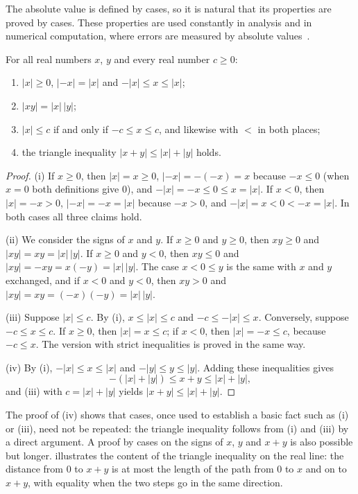The absolute value is defined by cases, so it is natural that its properties are proved by cases. These properties are used constantly in analysis and in numerical computation, where errors are measured by absolute values~\cite{spivak2008calculus}.

\begin{proposition}
\label{prop:abs}
For all real numbers $x$, $y$ and every real number $c\ge0$:
\begin{enumerate}
\item $|x|\ge0$, $|-x|=|x|$ and $-|x|\le x\le|x|$;
\item $|xy|=|x|\,|y|$;
\item $|x|\le c$ if and only if $-c\le x\le c$, and likewise with $<$ in both places;
\item the triangle inequality $|x+y|\le|x|+|y|$ holds.
\end{enumerate}
\end{proposition}

\begin{proof}
(i) If $x\ge0$, then $|x|=x\ge0$, $|-x|=-(-x)=x$ because $-x\le0$ (when $x=0$ both definitions give $0$), and $-|x|=-x\le0\le x=|x|$. If $x<0$, then $|x|=-x>0$, $|-x|=-x=|x|$ because $-x>0$, and $-|x|=x<0<-x=|x|$. In both cases all three claims hold.

(ii) We consider the signs of $x$ and $y$. If $x\ge0$ and $y\ge0$, then $xy\ge0$ and $|xy|=xy=|x|\,|y|$. If $x\ge0$ and $y<0$, then $xy\le0$ and $|xy|=-xy=x(-y)=|x|\,|y|$. The case $x<0\le y$ is the same with $x$ and $y$ exchanged, and if $x<0$ and $y<0$, then $xy>0$ and $|xy|=xy=(-x)(-y)=|x|\,|y|$.

(iii) Suppose $|x|\le c$. By (i), $x\le|x|\le c$ and $-c\le-|x|\le x$. Conversely, suppose $-c\le x\le c$. If $x\ge0$, then $|x|=x\le c$; if $x<0$, then $|x|=-x\le c$, because $-c\le x$. The version with strict inequalities is proved in the same way.

(iv) By (i), $-|x|\le x\le|x|$ and $-|y|\le y\le|y|$. Adding these inequalities gives
\[
-(|x|+|y|)\le x+y\le|x|+|y|,
\]
and (iii) with $c=|x|+|y|$ yields $|x+y|\le|x|+|y|$.
\end{proof}

The proof of (iv) shows that cases, once used to establish a basic fact such as (i) or (iii), need not be repeated: the triangle inequality follows from (i) and (iii) by a direct argument. A proof by cases on the signs of $x$, $y$ and $x+y$ is also possible but longer.  illustrates the content of the triangle inequality on the real line: the distance from $0$ to $x+y$ is at most the length of the path from $0$ to $x$ and on to $x+y$, with equality when the two steps go in the same direction.

